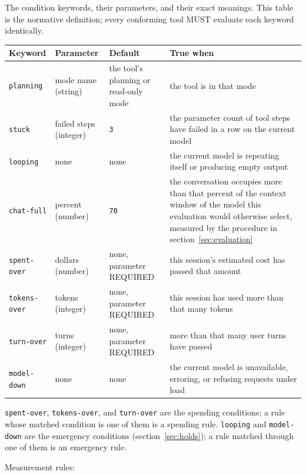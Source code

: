 \documentclass[11pt]{article}
\newcommand{\key}[1]{\texttt{#1}}
\begin{document}
The condition keywords, their parameters, and their exact meanings. This
table is the normative definition; every conforming tool MUST evaluate
each keyword identically.

\begin{tabularx}{\textwidth}{@{}lllX@{}}
\toprule
Keyword & Parameter & Default & True when \\
\midrule
\key{planning} & mode name (string) & the tool's planning or read-only mode & the tool is in that mode \\
\key{stuck} & failed steps (integer) & \key{3} & the parameter count of tool steps have failed in a row on the current model \\
\key{looping} & none & none & the current model is repeating itself or producing empty output \\
\key{chat-full} & percent (number) & \key{70} & the conversation occupies more than that percent of the context window of the model this evaluation would otherwise select, measured by the procedure in section~\ref{sec:evaluation} \\
\key{spent-over} & dollars (number) & none, parameter REQUIRED & this session's estimated cost has passed that amount \\
\key{tokens-over} & tokens (integer) & none, parameter REQUIRED & this session has used more than that many tokens \\
\key{turn-over} & turns (integer) & none, parameter REQUIRED & more than that many user turns have passed \\
\key{model-down} & none & none & the current model is unavailable, erroring, or refusing requests under load \\
\bottomrule
\end{tabularx}

\medskip
\key{spent-over}, \key{tokens-over}, and \key{turn-over} are the
spending conditions; a rule whose matched condition is one of them is a
spending rule. \key{looping} and \key{model-down} are the emergency
conditions (section~\ref{sec:holds}); a rule matched through one of
them is an emergency rule.

Measurement rules:
\end{document}
